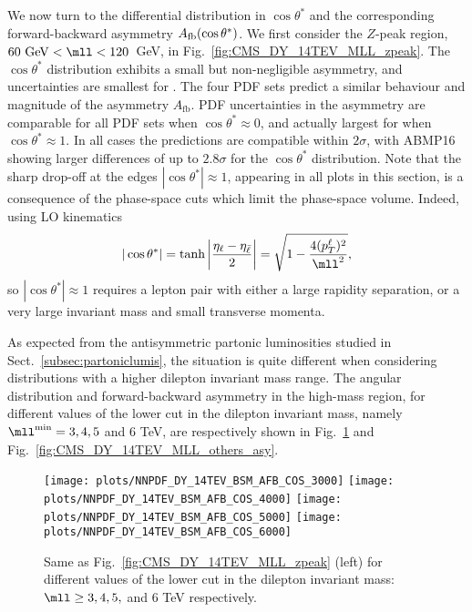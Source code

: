 We now turn to the differential distribution in
  $\cos\theta^*$ 
  and the corresponding forward-backward asymmetry $A_{\rm
    fb}(\cos\theta^*)$.
We first consider the $Z$-peak region, $60~{\rm GeV} < \mll <
120$~GeV, in Fig.~\ref{fig:CMS_DY_14TEV_MLL_zpeak}.
%
The $\cos\theta^*$ 
distribution exhibits a small but non-negligible asymmetry,
and uncertainties are  smallest for .
%
The four PDF sets predict a similar behaviour and magnitude
of the asymmetry $A_\mathrm{fb}$.
%
PDF uncertainties in the asymmetry
are  comparable for  all PDF sets when $\cos\theta^* \approx0$,
and actually  largest for  when $\cos\theta^* \approx 1$.
In all cases the predictions are compatible within $2 \sigma$,
with ABMP16 showing larger differences of up to $2.8 \sigma$ for the $\cos\theta^*$
distribution.
%
Note that the
sharp drop-off at the edges $|\cos\theta^*| \approx  1$, appearing in
all plots in this section, is a consequence of the phase-space cuts which
limit the phase-space volume.
%
Indeed, using  LO kinematics
\begin{equation}
| \cos\theta^* | = \tanh \left| \frac{\eta_\ell - \eta_{\bar{\ell}}}{2} \right| = \sqrt{1 - \frac{4 (p_T^\ell)^2}{\mll^2}} \text{,}
\end{equation}
so $| \cos\theta^* | \approx 1$ requires a lepton pair with either
a large rapidity separation, or a very large invariant mass and small
transverse momenta. 

As expected from the antisymmetric partonic luminosities studied in
Sect.~\ref{subsec:partoniclumis}, the situation is quite different when
considering distributions with a higher dilepton invariant mass range.
%
The angular distribution and forward-backward asymmetry
in the high-mass region, for different values of the  lower cut in the dilepton
 invariant mass, namely $\mll^{\rm min}=3, 4,5$ and 6 TeV, are
 respectively
 shown in
Fig.~\ref{fig:CMS_DY_14TEV_MLL_others} and Fig.~\ref{fig:CMS_DY_14TEV_MLL_others_asy}.

\begin{figure}[t!]
 \centering
 \texttt{[image: plots/NNPDF\_DY\_14TEV\_BSM\_AFB\_COS\_3000]}
 \texttt{[image: plots/NNPDF\_DY\_14TEV\_BSM\_AFB\_COS\_4000]}
 \texttt{[image: plots/NNPDF\_DY\_14TEV\_BSM\_AFB\_COS\_5000]}
 \texttt{[image: plots/NNPDF\_DY\_14TEV\_BSM\_AFB\_COS\_6000]}
 \caption{Same as Fig.~\ref{fig:CMS_DY_14TEV_MLL_zpeak} (left)
   for different values of the  lower cut in the dilepton
   invariant mass: $\mll \ge 3, 4,5,$ and 6 TeV respectively.
  }    
 \label{fig:CMS_DY_14TEV_MLL_others}
\end{figure}

